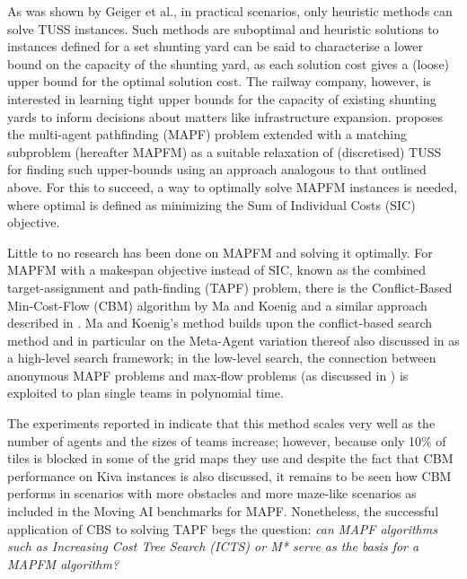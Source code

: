 \documentclass[english,10pt]{article}
\begin{document}
	As was shown by Geiger et al.\cite{geiger2018}, in practical scenarios, only heuristic methods can solve TUSS instances. 
	Such methods are suboptimal and heuristic solutions to instances defined for a set shunting yard can be said to characterise a lower bound on the capacity of the shunting yard, as each solution cost gives a (loose) upper bound for the optimal solution cost. 
	The railway company, however, is interested in learning tight upper bounds for the capacity of existing shunting yards to inform decisions about matters like infrastructure expansion. \cite{mulderij2020} proposes the multi-agent pathfinding (MAPF) problem \cite{stern2019} extended with a matching subproblem (hereafter MAPFM) as a suitable relaxation of (discretised) TUSS for finding such upper-bounds using an approach analogous to that outlined above.
	For this to succeed, a way to optimally solve MAPFM instances is needed, where optimal is defined as minimizing the Sum of Individual Costs (SIC) objective.
	
	Little to no research has been done on MAPFM and solving it optimally. For MAPFM with a makespan objective instead of SIC, known as the combined  target-assignment  and  path-finding (TAPF) problem, there is the Conflict-Based Min-Cost-Flow (CBM) algorithm by Ma and Koenig \cite{ma2016} and a similar approach described in \cite{henkel2019}. Ma and Koenig's method builds upon the conflict-based search method and in particular on the Meta-Agent variation thereof also discussed in \cite{sharon2015} as a high-level search framework; in the low-level search, the connection between anonymous MAPF problems and max-flow problems (as discussed in \cite{yu2013}) is exploited to plan single teams in polynomial time. 
	
	The experiments reported in \cite{ma2016} indicate that this method scales very well as the number of agents and the sizes of teams increase; however, because only 10\% of tiles is blocked in some of the grid maps they use and despite the fact that CBM performance on Kiva\cite{wurman2007} instances is also discussed, it remains to be seen how CBM performs in scenarios with more obstacles and more maze-like scenarios as included in the Moving AI benchmarks \cite{sturtevant2012} for MAPF.
	Nonetheless, the successful application of CBS to solving TAPF begs the question: \textit{can MAPF algorithms such as Increasing Cost Tree Search (ICTS) \cite{sharon2011} or M* \cite{wagner2011} serve as the basis for a MAPFM algorithm?}
	
\end{document}
